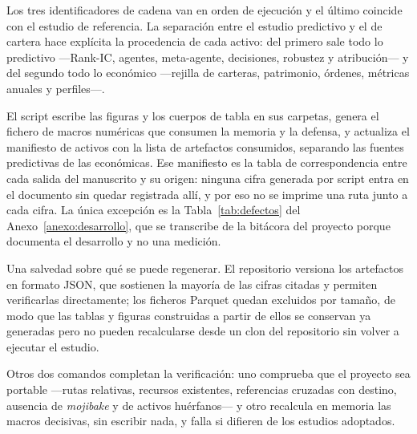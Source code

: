 Los tres identificadores de cadena van en orden de ejecución y el último coincide con el estudio de
referencia. La separación entre el estudio predictivo y el de cartera hace explícita la procedencia
de cada activo: del primero sale todo lo predictivo ---Rank-IC, agentes, meta-agente, decisiones,
robustez y atribución--- y del segundo todo lo económico ---rejilla de carteras, patrimonio,
órdenes, métricas anuales y perfiles---.

El script escribe las figuras y los cuerpos de tabla en sus carpetas, genera el fichero de macros
numéricas que consumen la memoria y la defensa, y actualiza el manifiesto de activos con la lista de
artefactos consumidos, separando las fuentes predictivas de las económicas. Ese manifiesto es la
tabla de correspondencia entre cada salida del manuscrito y su origen: ninguna cifra generada por
script entra en el documento sin quedar registrada allí, y por eso no se imprime una ruta junto a
cada cifra. La única excepción es la Tabla~\ref{tab:defectos} del Anexo~\ref{anexo:desarrollo}, que
se transcribe de la bitácora del proyecto porque documenta el desarrollo y no una medición.

Una salvedad sobre qué se puede regenerar. El repositorio versiona los artefactos en formato JSON,
que sostienen la mayoría de las cifras citadas y permiten verificarlas directamente; los ficheros
Parquet quedan excluidos por tamaño, de modo que las tablas y figuras construidas a partir de ellos
se conservan ya generadas pero no pueden recalcularse desde un clon del repositorio sin volver a
ejecutar el estudio.

Otros dos comandos completan la verificación: uno comprueba que el proyecto sea portable ---rutas
relativas, recursos existentes, referencias cruzadas con destino, ausencia de \textit{mojibake} y de
activos huérfanos--- y otro recalcula en memoria las macros decisivas, sin escribir nada, y falla si
difieren de los estudios adoptados.

